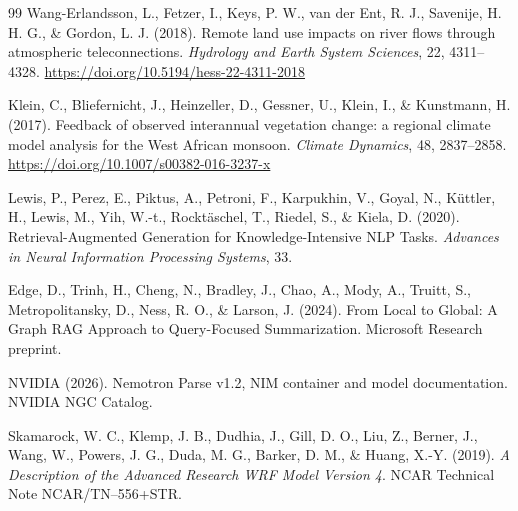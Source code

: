\documentclass[10pt,twocolumn]{article}
\begin{document}
\begin{thebibliography}{99}
Wang-Erlandsson, L., Fetzer, I., Keys, P. W., van der Ent, R. J., Savenije, H. H. G., \& Gordon, L. J. (2018). Remote land use impacts on river flows through atmospheric teleconnections. \textit{Hydrology and Earth System Sciences}, 22, 4311--4328. \url{https://doi.org/10.5194/hess-22-4311-2018}

Klein, C., Bliefernicht, J., Heinzeller, D., Gessner, U., Klein, I., \& Kunstmann, H. (2017). Feedback of observed interannual vegetation change: a regional climate model analysis for the West African monsoon. \textit{Climate Dynamics}, 48, 2837--2858. \url{https://doi.org/10.1007/s00382-016-3237-x}

Lewis, P., Perez, E., Piktus, A., Petroni, F., Karpukhin, V., Goyal, N., K\"uttler, H., Lewis, M., Yih, W.-t., Rockt\"aschel, T., Riedel, S., \& Kiela, D. (2020). Retrieval-Augmented Generation for Knowledge-Intensive NLP Tasks. \textit{Advances in Neural Information Processing Systems}, 33.

Edge, D., Trinh, H., Cheng, N., Bradley, J., Chao, A., Mody, A., Truitt, S., Metropolitansky, D., Ness, R. O., \& Larson, J. (2024). From Local to Global: A Graph RAG Approach to Query-Focused Summarization. Microsoft Research preprint.

NVIDIA (2026). Nemotron Parse v1.2, NIM container and model documentation. NVIDIA NGC Catalog.

Skamarock, W. C., Klemp, J. B., Dudhia, J., Gill, D. O., Liu, Z., Berner, J., Wang, W., Powers, J. G., Duda, M. G., Barker, D. M., \& Huang, X.-Y. (2019). \textit{A Description of the Advanced Research WRF Model Version 4}. NCAR Technical Note NCAR/TN--556+STR.

\end{thebibliography}
\end{document}
